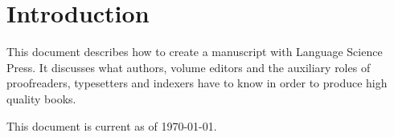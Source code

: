 \chapter{Introduction}
This document describes how to create a manuscript with Language Science Press. It discusses what authors, volume editors and the auxiliary roles of proofreaders, typesetters and indexers have to know in order to produce high quality books.

This document is current as of \today. 

